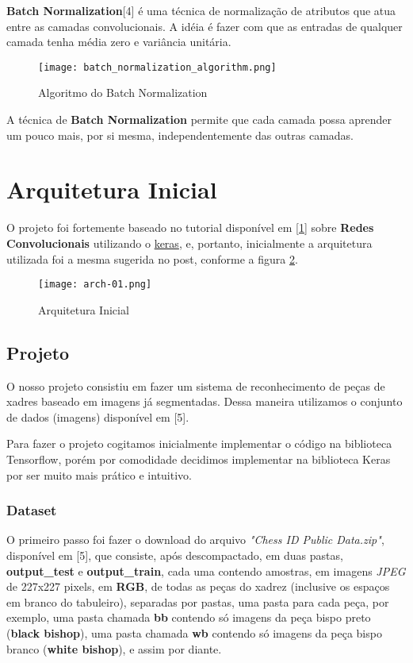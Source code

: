 \textbf{Batch Normalization}[4] é uma técnica de normalização de atributos que atua
entre as camadas convolucionais. A idéia é fazer com que as entradas de qualquer
camada tenha média zero e variância unitária.

\begin{figure}[ht]
\centering
\texttt{[image: batch\_normalization\_algorithm.png]}
\caption{Algoritmo do Batch Normalization}\label{fig:batch-norm}
\end{figure}


A técnica de \textbf{Batch Normalization} permite que cada camada possa aprender
um pouco mais, por si mesma, independentemente das outras camadas.

    \section{Arquitetura Inicial}\label{arquitetura-inicial}

O projeto foi fortemente baseado no tutorial disponível em
\href{http://adventuresinmachinelearning.com/keras-tutorial-cnn-11-lines/}{[1]} sobre \textbf{Redes
Convolucionais} utilizando o \href{https://keras.io/}{keras}, e, portanto, inicialmente a
arquitetura utilizada foi a mesma sugerida no post, conforme a figura \ref{fig:arch-init}.

\begin{figure}[ht]
\centering
\texttt{[image: arch-01.png]}
\caption{Arquitetura Inicial}\label{fig:arch-init}
\end{figure}


    \subsection{Projeto}\label{projeto}

O nosso projeto consistiu em fazer um sistema de reconhecimento de peças
de xadres baseado em imagens já segmentadas. Dessa maneira utilizamos o
conjunto de dados (imagens) disponível em [5].

Para fazer o projeto cogitamos inicialmente implementar o código na
biblioteca Tensorflow, porém por comodidade decidimos implementar na
biblioteca Keras por ser muito mais prático e intuitivo.

    \subsubsection{Dataset}\label{dataset}

O primeiro passo foi fazer o download do arquivo \emph{"Chess ID Public Data.zip"},
disponível em [5], que consiste, após descompactado, em duas pastas, \textbf{output\_test}
e \textbf{output\_train}, cada uma contendo amostras, em imagens \emph{JPEG} de 227x227 pixels,
em \textbf{RGB}, de todas as peças do xadrez (inclusive os espaços em branco do tabuleiro),
separadas por pastas, uma pasta para cada peça, por exemplo, uma pasta chamada \textbf{bb}
contendo só imagens da peça bispo preto (\textbf{black bishop}), uma pasta chamada
\textbf{wb} contendo só imagens da peça bispo branco (\textbf{white bishop}), e assim por diante.

